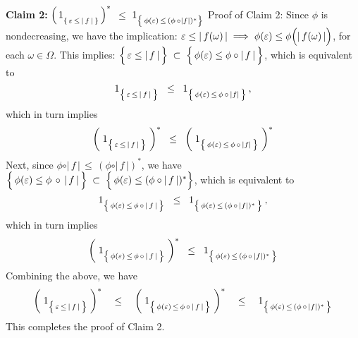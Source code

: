 \vskip 0.5cm
\noindent
\textbf{Claim 2:}\;\;
$\left(\,1_{\{\,\varepsilon\,\leq\,\vert\,\overset{{\color{white}.}}{f}\,\vert\,\}}\,\right)^{*}$
\;\;$\leq$\;\;
$1_{\left\{\,\phi(\varepsilon)\,\overset{{\color{white}.}}{\leq}\,(\phi\,\circ\vert f \vert)^{*}\right\}}$
\vskip 0.1cm
\noindent
Proof of Claim 2:
Since $\phi$ is nondecreasing, we have the implication:\;
$\varepsilon \leq \vert\,f(\omega)\,\vert
\;\Longrightarrow\;
\phi(\varepsilon) \leq \phi\!\left(\vert\,f(\overset{{\color{white}-}}{\omega})\,\vert\right)$,
for each $\omega \in \Omega$.
This implies:
$\left\{\,\varepsilon \overset{{\color{white}.}}{\leq} \vert\,f\,\vert\,\right\}
\;\subset\;
\left\{\, \phi(\varepsilon) \overset{{\color{white}.}}{\leq} \phi\circ\vert\,f\,\vert\,\right\}$,
which is equivalent to
\begin{equation*}
1_{\left\{\,\varepsilon \,\overset{{\color{white}.}}{\leq}\, \vert\,f\,\vert\,\right\}}
\;\;\leq\;\;
	1_{\left\{\, \phi(\varepsilon) \,\overset{{\color{white}.}}{\leq}\, \phi\,\circ\,\vert f \vert\,\right\}}\,,
\end{equation*}
which in turn implies
\begin{equation*}
\left(\;1_{\left\{\,\varepsilon \,\overset{{\color{white}.}}{\leq}\, \vert\,f\,\vert\,\right\}}\;\right)^{*}
\;\;\leq\;\;
	\left(\;1_{\left\{\, \phi(\varepsilon) \,\overset{{\color{white}.}}{\leq}\, \phi\,\circ\,\vert f \vert\,\right\}}\;\right)^{*}
\end{equation*}
Next, since $\phi\circ\vert\,f\,\vert\,\leq\,(\phi\circ\vert\,f\,\vert)^{*}$, we have
$\left\{\,\phi(\varepsilon) \overset{{\color{white}.}}{\leq} \phi\,\circ\,\vert\,f\,\vert\,\right\}
\;\subset\;
\left\{\, \phi(\varepsilon) \overset{{\color{white}.}}{\leq} (\phi\circ\vert\,f\,\vert)^{*}\right\}$,
which is equivalent to
\begin{equation*}
1_{\left\{\,\phi(\varepsilon) \,\overset{{\color{white}.}}{\leq}\, \phi\,\circ\,\vert\,f\,\vert\,\right\}}
\;\;\leq\;\;
	1_{\left\{\, \phi(\varepsilon) \,\overset{{\color{white}.}}{\leq}\, (\phi\,\circ\,\vert f \vert)^{*}\,\right\}}\,,
\end{equation*}
which in turn implies
\begin{equation*}
\left(\;1_{\left\{\,\phi(\varepsilon) \,\overset{{\color{white}.}}{\leq}\, \phi\,\circ\,\vert\,f\,\vert\,\right\}}\;\right)^{*}
\;\;\leq\;\;
	1_{\left\{\, \phi(\varepsilon) \,\overset{{\color{white}.}}{\leq}\, (\phi\,\circ\,\vert f \vert)^{*}\,\right\}}
\end{equation*}
Combining the above, we have
\begin{equation*}
\left(\;1_{\left\{\,\varepsilon \,\overset{{\color{white}.}}{\leq}\, \vert\,f\,\vert\,\right\}}\;\right)^{*}
\quad\leq\quad
	\left(\;1_{\left\{\,\phi(\varepsilon) \,\overset{{\color{white}.}}{\leq}\, \phi\,\circ\,\vert\,f\,\vert\,\right\}}\;\right)^{*}
\quad\leq\quad
	1_{\left\{\, \phi(\varepsilon) \,\overset{{\color{white}.}}{\leq}\, (\phi\,\circ\,\vert f \vert)^{*}\,\right\}}
\end{equation*}
This completes the proof of Claim 2.


